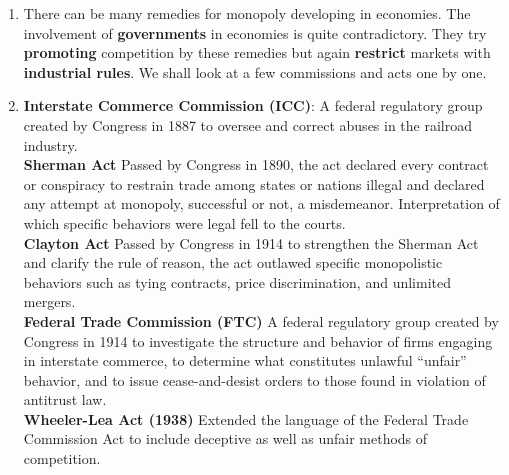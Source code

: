 \documentclass[12pt]{article}
\begin{document}
\begin{enumerate}
\item There can be many remedies for monopoly developing in economies. The involvement of \textbf{governments} in economies is quite contradictory. They try \textbf{promoting} competition by these remedies but again \textbf{restrict} markets with \textbf{industrial rules}. We shall look at a few commissions and acts one by one.
\item \textbf{Interstate Commerce Commission (ICC)}:  A federal regulatory group created by Congress in 1887 to oversee and correct abuses in the railroad industry.\\
\textbf{Sherman Act} Passed by Congress in 1890, the act declared every contract or conspiracy to restrain trade among states or nations illegal and declared any attempt at monopoly, successful or not, a misdemeanor.  Interpretation of which specific behaviors were legal fell to the courts.\\
\textbf{Clayton Act} Passed by Congress in 1914 to strengthen the Sherman Act and clarify the rule of reason, the act outlawed specific monopolistic behaviors such as tying contracts, price discrimination, and unlimited mergers.\\
\textbf{Federal Trade Commission (FTC)} A federal regulatory group created by Congress in 1914 to investigate the structure and behavior of firms engaging in interstate commerce, to determine what constitutes unlawful “unfair” behavior, and to issue cease-and-desist orders to those found in violation of antitrust law.\\
\textbf{Wheeler-Lea Act (1938)} Extended the language of the Federal Trade Commission Act to include deceptive as well as unfair methods of competition.\\


\end{enumerate}
\end{document}

